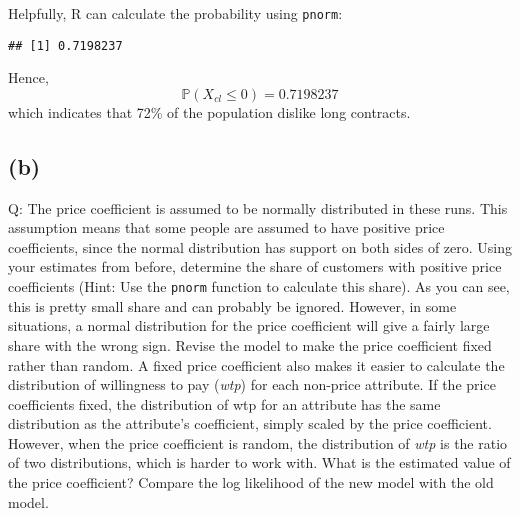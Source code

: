 \documentclass[
]{article}
\newenvironment{Shaded}{\begin{snugshade}}{\end{snugshade}}
\newcommand{\DecValTok}[1]{\textcolor[rgb]{0.00,0.00,0.81}{#1}}
\newcommand{\KeywordTok}[1]{\textcolor[rgb]{0.13,0.29,0.53}{\textbf{#1}}}
\newcommand{\NormalTok}[1]{#1}
\newcommand{\OperatorTok}[1]{\textcolor[rgb]{0.81,0.36,0.00}{\textbf{#1}}}
\newcommand{\StringTok}[1]{\textcolor[rgb]{0.31,0.60,0.02}{#1}}
\begin{document}

Helpfully, R can calculate the probability using \texttt{pnorm}:

\begin{Shaded}
\end{Shaded}

\begin{verbatim}
## [1] 0.7198237
\end{verbatim}

Hence, \begin{equation*}
\mathbb{P}\left(X_{cl}\leq 0\right)=0.7198237
\end{equation*} which indicates that 72\% of the population dislike long
contracts.

\hypertarget{b}{%
\subsection{(b)}\label{b}}

Q: The price coefficient is assumed to be normally distributed in these
runs. This assumption means that some people are assumed to have
positive price coefficients, since the normal distribution has support
on both sides of zero. Using your estimates from before, determine the
share of customers with positive price coefficients (Hint: Use the
\texttt{pnorm} function to calculate this share). As you can see, this
is pretty small share and can probably be ignored. However, in some
situations, a normal distribution for the price coefficient will give a
fairly large share with the wrong sign. Revise the model to make the
price coefficient fixed rather than random. A fixed price coefficient
also makes it easier to calculate the distribution of willingness to pay
(\emph{wtp}) for each non-price attribute. If the price coefficients
fixed, the distribution of wtp for an attribute has the same
distribution as the attribute's coefficient, simply scaled by the price
coefficient. However, when the price coefficient is random, the
distribution of \emph{wtp} is the ratio of two distributions, which is
harder to work with. What is the estimated value of the price
coefficient? Compare the log likelihood of the new model with the old
model.
\end{document}
